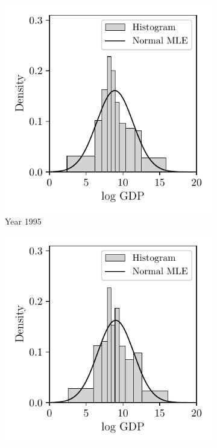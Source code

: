 \begin{figure}[t]
  \centering
  \begin{subfigure}{0.32\textwidth}
    \centering
    \includegraphics[scale=0.64]{graphics/trade_gdp_1995.pdf}
    \caption{Year 1995}
  \end{subfigure}
  \begin{subfigure}{0.32\textwidth}
    \centering
    \includegraphics[scale=0.64]{graphics/trade_gdp_2000.pdf}

\end{subfigure}
\end{figure}
